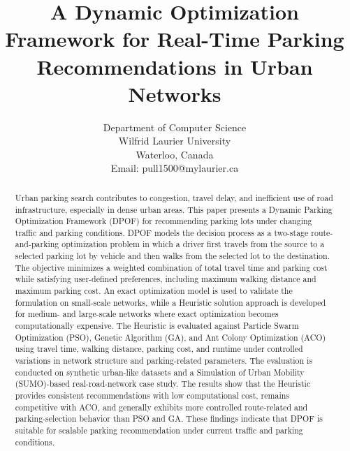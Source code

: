 
\usepackage{cite}
\usepackage{amsmath,amssymb}
\usepackage{graphicx}
\usepackage{algorithm}
\usepackage{algorithmic}
\usepackage{url}
\usepackage{tabularx}
\usepackage{booktabs}
\usepackage{comment}

\title{A Dynamic Optimization Framework for Real-Time Parking Recommendations in Urban Networks}

\author{
Department of Computer Science \\
Wilfrid Laurier University \\
Waterloo, Canada \\
Email: pull1500@mylaurier.ca
}



\maketitle

\begin{abstract}
Urban parking search contributes to congestion, travel delay, and inefficient use of road infrastructure, especially in dense urban areas. This paper presents a Dynamic Parking Optimization Framework (DPOF) for recommending parking lots under changing traffic and parking conditions. DPOF models the decision process as a two-stage route-and-parking optimization problem in which a driver first travels from the source to a selected parking lot by vehicle and then walks from the selected lot to the destination. The objective minimizes a weighted combination of total travel time and parking cost while satisfying user-defined preferences, including maximum walking distance and maximum parking cost. An exact optimization model is used to validate the formulation on small-scale networks, while a Heuristic solution approach is developed for medium- and large-scale networks where exact optimization becomes computationally expensive. The Heuristic is evaluated against Particle Swarm Optimization (PSO), Genetic Algorithm (GA), and Ant Colony Optimization (ACO) using travel time, walking distance, parking cost, and runtime under controlled variations in network structure and parking-related parameters. The evaluation is conducted on synthetic urban-like datasets and a Simulation of Urban Mobility (SUMO)-based real-road-network case study. The results show that the Heuristic provides consistent recommendations with low computational cost, remains competitive with ACO, and generally exhibits more controlled route-related and parking-selection behavior than PSO and GA. These findings indicate that DPOF is suitable for scalable parking recommendation under current traffic and parking conditions.
\end{abstract}

